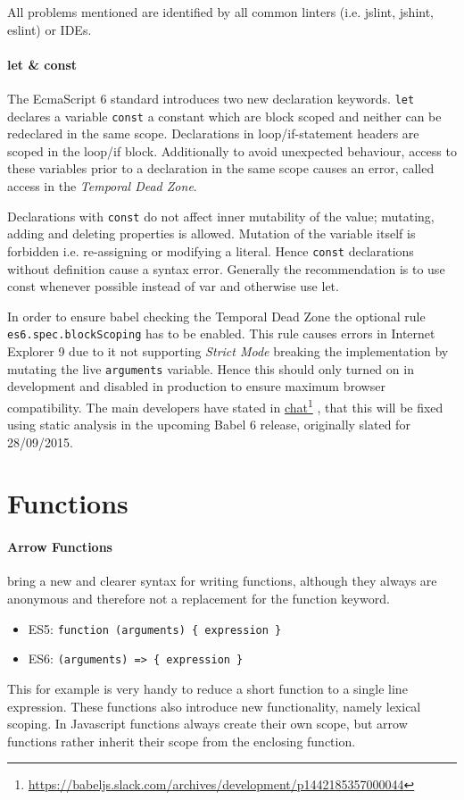 \documentclass{bioinfo}
\newcommand\fnurl[2]{%
  \href{#1}{#2}\footnote{\url{#1}}%
}
\begin{document}
All problems mentioned are identified by all common linters (i.e. jslint, jshint, eslint)
or IDEs.


\paragraph{let \& const\textcolon}
The EcmaScript 6 standard introduces two new declaration keywords. {\tt let} declares
a variable {\tt const} a constant which are block scoped and neither can be redeclared
in the same scope. Declarations in loop/if-statement headers are scoped in the loop/if
block. Additionally to avoid unexpected behaviour, access to these variables prior
to a declaration in the same scope causes an error, called access in
the {\em Temporal Dead Zone}.

Declarations with {\tt const} do not affect inner mutability of the value;
mutating, adding and deleting properties is allowed. Mutation of the variable
itself is forbidden i.e. re-assigning or modifying a literal. Hence {\tt const}
declarations without definition cause a syntax error. Generally the recommendation
is to use const whenever possible instead of var and otherwise use let.

In order to ensure babel checking the Temporal Dead Zone the optional rule
{\tt es6.spec.blockScoping} has to be enabled. This rule causes errors in
Internet Explorer 9 due to it not supporting {\sl Strict Mode} breaking the
implementation by mutating the live {\tt arguments} variable. Hence this
should only turned on in development and disabled in production
to ensure maximum browser compatibility. The main developers have stated in
\fnurl{https://babeljs.slack.com/archives/development/p1442185357000044}{chat},
that this will be fixed using static analysis in the upcoming Babel 6 release,
originally slated for 28/09/2015.

\section{Functions}
\paragraph{Arrow Functions}
bring a new and clearer syntax for writing functions, although
they always are anonymous and therefore not a replacement for the function keyword.
\begin{itemize}
    \item ES5: \tt{function (arguments) \{ expression \}}
    \item ES6: \tt{(arguments) => \{ expression \}}
\end{itemize}
This for example is very handy to reduce a short function to a single line expression.
These functions also introduce new functionality, namely lexical scoping.
In Javascript functions always create their own scope, but arrow functions
rather inherit their scope from the enclosing function.
\end{document}
